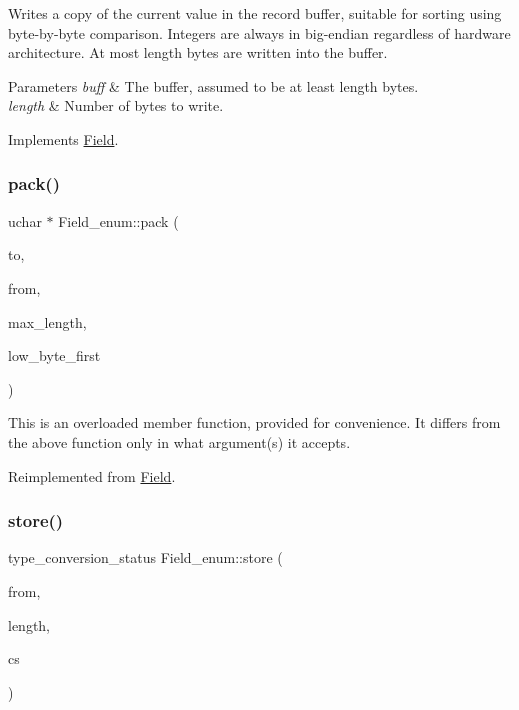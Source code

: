 Writes a copy of the current value in the record buffer, suitable for sorting using byte-\/by-\/byte comparison. Integers are always in big-\/endian regardless of hardware architecture. At most length bytes are written into the buffer.


\begin{DoxyParams}{Parameters}
{\em buff} & The buffer, assumed to be at least length bytes.\\
\hline
{\em length} & Number of bytes to write. \\
\hline
\end{DoxyParams}


Implements \mbox{\hyperlink{classField_af3bc27d237b6ae6ef3dc7a2aec3d79ac}{Field}}.

\mbox{\label{classField__enum_ab9e1135fdf17255f7a96193463d58bdd}} 
\subsubsection{\texorpdfstring{pack()}{pack()}}
{\footnotesize\ttfamily uchar $\ast$ Field\+\_\+enum\+::pack (\begin{DoxyParamCaption}\item[{uchar $\ast$}]{to,  }\item[{const uchar $\ast$}]{from,  }\item[{uint}]{max\+\_\+length,  }\item[{bool}]{low\+\_\+byte\+\_\+first }\end{DoxyParamCaption})\hspace{0.3cm}{\ttfamily [virtual]}}

This is an overloaded member function, provided for convenience. It differs from the above function only in what argument(s) it accepts.

Reimplemented from \mbox{\hyperlink{classField_a9eaff8d3425ef0e1da69b32cbd8f2879}{Field}}.

\mbox{\label{classField__enum_a94360342df3a8e26e37d2e479d36cbb5}} 
\subsubsection{\texorpdfstring{store()}{store()}\hspace{0.1cm}{\footnotesize\ttfamily [1/2]}}
{\footnotesize\ttfamily type\+\_\+conversion\+\_\+status Field\+\_\+enum\+::store (\begin{DoxyParamCaption}\item[{const char $\ast$}]{from,  }\item[{size\+\_\+t}]{length,  }\item[{const C\+H\+A\+R\+S\+E\+T\+\_\+\+I\+N\+FO $\ast$}]{cs }\end{DoxyParamCaption})\hspace{0.3cm}{\ttfamily [virtual]}}

